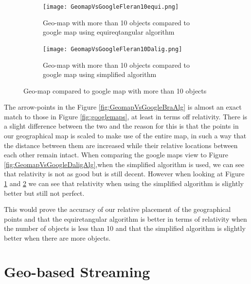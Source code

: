 \begin{figure}
\begin{subfigure}[b]{0.5\textwidth}
       \texttt{[image: GeomapVsGoogleFleran10equi.png]}
		\caption{Geo-map with more than 10 objects compared to google map using equireqtangular algorithm}
  	\label{fig:GeomapVsGoogleFleran10equi}
    \end{subfigure}\hfill 
    \hspace{3px}
    \begin{subfigure}[b]{0.5\textwidth}
       \texttt{[image: GeomapVsGoogleFleran10Dalig.png]}
  \caption{Geo-map with more than 10 objects compared to google map using simplified algorithm}	\label{fig:GeomapVsGoogleFleran10Dalig}
    \end{subfigure}
	\caption{Geo-map compared to google map with more than 10 objects}
	\label{fig:GeomapVsGoogleWithMoreThan10objects}
\end{figure}

The arrow-points in the Figure \ref{fig:GeomapVsGoogleBraAlg} is almost an exact match to those in Figure \ref{fig:googlemaps}, at least in terms off relativity. There is a slight difference between the two and the reason for this is that the points in our geographical map is scaled to make use of the entire map, in such a way that the distance between them are increased while their relative locations between each other remain intact. When comparing the google maps view to Figure \ref{fig:GeomapVsGoogleDaligAlg},when the simplified algorithm is used, we can see that relativity is not as good but is still decent. However when looking at Figure \ref{fig:GeomapVsGoogleFleran10equi} and \ref{fig:GeomapVsGoogleFleran10Dalig} we can see that relativity when using the simplified algorithm is slightly better but still not perfect. 

This would prove the accuracy of our relative placement of the geographical points and that the equiretangular algorithm is better in terms of relativity when the number of objects is less than 10 and that the simplified algorithm is slightly better when there are more objects.

\section{Geo-based Streaming}
\label{sec:geobasedstreaming}

